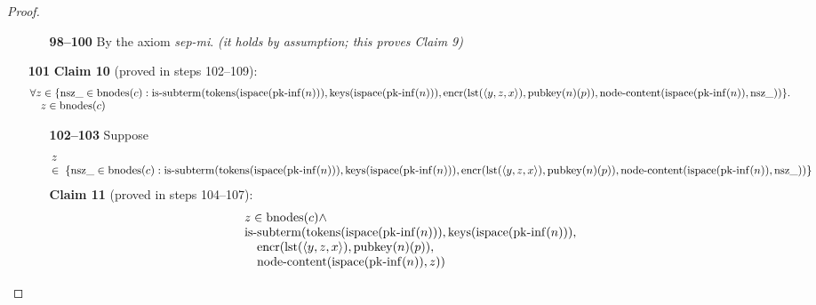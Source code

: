 \documentclass[11pt]{article}
\theoremstyle{plain}
\begin{document}
\begin{proof}
\begin{itemize}[leftmargin=2.8em, itemsep=4pt, parsep=1pt]
  \begin{itemize}[leftmargin=2.8em, itemsep=4pt, parsep=1pt]
  \item[\textbf{98--100}] By the axiom \emph{sep-mi}.  \emph{(it holds by assumption; this proves Claim 9)}
  \end{itemize}
  \item[\textbf{101}] \textbf{Claim 10} (proved in steps 102--109):
\begin{equation*}
\begin{array}{@{}l@{}} \forall z \in \{\operatorname{nsz\_} \in \operatorname{bnodes}(c) : \operatorname{is\text{-}subterm}(\operatorname{tokens}(\operatorname{ispace}(\operatorname{pk\text{-}inf}(n))), \operatorname{keys}(\operatorname{ispace}(\operatorname{pk\text{-}inf}(n))), \operatorname{encr}(\operatorname{lst}(\langle y, z, x \rangle), \operatorname{pubkey}(n)(p)), \operatorname{node\text{-}content}(\operatorname{ispace}(\operatorname{pk\text{-}inf}(n)), \operatorname{nsz\_}))\}. \\ \quad z \in \operatorname{bnodes}(c) \end{array}
\end{equation*}

  \begin{itemize}[leftmargin=2.8em, itemsep=4pt, parsep=1pt]
  \item[\textbf{102--103}] Suppose 
\begin{equation*}
\begin{array}{@{}l@{}}
\begin{array}{@{}l@{}} z \\ \in\; \{\operatorname{nsz\_} \in \operatorname{bnodes}(c) : \operatorname{is\text{-}subterm}(\operatorname{tokens}(\operatorname{ispace}(\operatorname{pk\text{-}inf}(n))), \operatorname{keys}(\operatorname{ispace}(\operatorname{pk\text{-}inf}(n))), \operatorname{encr}(\operatorname{lst}(\langle y, z, x \rangle), \operatorname{pubkey}(n)(p)), \operatorname{node\text{-}content}(\operatorname{ispace}(\operatorname{pk\text{-}inf}(n)), \operatorname{nsz\_}))\} \end{array}
\end{array}
\end{equation*}
\textbf{Claim 11} (proved in steps 104--107):
\begin{equation*}
\begin{array}{@{}l@{}} z \in \operatorname{bnodes}(c) \wedge \\ \operatorname{is\text{-}subterm}(\operatorname{tokens}(\operatorname{ispace}(\operatorname{pk\text{-}inf}(n))), \operatorname{keys}(\operatorname{ispace}(\operatorname{pk\text{-}inf}(n))), \\ \quad \operatorname{encr}(\operatorname{lst}(\langle y, z, x \rangle), \operatorname{pubkey}(n)(p)), \\ \quad \operatorname{node\text{-}content}(\operatorname{ispace}(\operatorname{pk\text{-}inf}(n)), z)) \end{array}
\end{equation*}


\end{itemize}
\end{itemize}
\end{proof}
\end{document}
